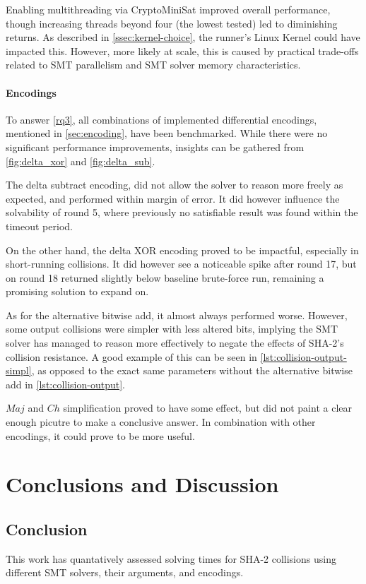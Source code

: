 \documentclass[a4paper]{report}
\begin{document}
Enabling multithreading via CryptoMiniSat improved overall performance, though increasing threads beyond four (the lowest tested) led to diminishing returns.
As described in \ref{ssec:kernel-choice}, the runner's Linux Kernel could have impacted this.
However, more likely at scale, this is caused by practical trade-offs related to SMT parallelism and SMT solver memory characteristics.

\subsubsection{Encodings}
\label{sssec:encoding-analysis}

To answer \ref{rq3}, all combinations of implemented differential encodings, mentioned in \ref{sec:encoding}, have been benchmarked.
While there were no significant performance improvements, insights can be gathered from \ref{fig:delta_xor} and \ref{fig:delta_sub}.

The delta subtract encoding, did not allow the solver to reason more freely as expected, and performed within margin of error.
It did however influence the solvability of round 5, where previously no satisfiable result was found within the timeout period.

On the other hand, the delta XOR encoding proved to be impactful, especially in short-running collisions.
It did however see a noticeable spike after round 17, but on round 18 returned slightly below baseline brute-force run, remaining a promising solution to expand on.

As for the alternative bitwise add, it almost always performed worse.
However, some output collisions were simpler with less altered bits, implying the SMT solver has managed to reason more effectively to negate the effects of SHA-2's collision resistance.
A good example of this can be seen in \ref{lst:collision-output-simpl}, as opposed to the exact same parameters without the alternative bitwise add in \ref{lst:collision-output}.

$Maj$ and $Ch$ simplification proved to have some effect, but did not paint a clear enough picutre to make a conclusive answer.
In combination with other encodings, it could prove to be more useful.


\chapter{Conclusions and Discussion}
\section{Conclusion}
This work has quantatively assessed solving times for SHA-2 collisions using different SMT solvers, their arguments, and encodings.
\end{document}
